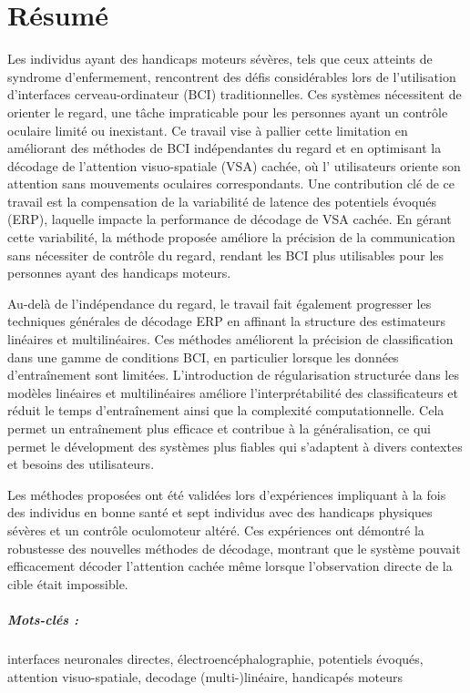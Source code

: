 \chapter*{R\'esum\'e}

Les individus ayant des handicaps moteurs sévères, tels que ceux atteints de
syndrome d'enfermement, rencontrent des défis considérables
lors de l'uti\-li\-sa\-tion d'interfaces cerveau-ordinateur (BCI)  traditionnelles.
Ces systèmes nécessitent de orienter le regard, une tâche impraticable pour
les personnes ayant un contrôle oculaire limité ou inexistant.
Ce travail vise \`a pallier cette limitation en améliorant des méthodes de BCI
indépendantes du regard et en optimisant la décodage de l'attention visuo-spatiale (VSA) cachée,
où l' utilisateurs oriente son attention sans mouvements oculaires correspondants.
Une contribution clé de ce travail est la compensation de
la variabilité de latence des potentiels évoqués (ERP), laquelle impacte
la performance de décodage de VSA cachée.
En gérant cette variabilit\'e, la méthode proposée améliore la précision de la communication
sans nécessiter de contrôle du regard, rendant les BCI plus utilisables pour les personnes ayant des handicaps moteurs.

Au-delà de l'indépendance du regard, le travail fait également progresser les
techniques générales de décodage ERP en affinant la structure des estimateurs
linéaires et multilinéaires.
Ces méthodes améliorent la précision de classification dans une gamme de
conditions BCI, en particulier lorsque les données d'entraînement sont limitées.
L'introduction de régularisation structurée dans les modèles linéaires et
multilinéaires améliore l'interprétabilité des classificateurs et réduit le temps d'entraînement ainsi que la complexité computationnelle.
Cela permet un entraînement plus efficace et contribue à la g\'en\'eralisation, ce qui
permet le d\'evelopment des systèmes plus fiables qui s'adaptent à divers
contextes et besoins des utilisateurs.

Les méthodes proposées ont été validées lors d'expériences impliquant à la fois
des individus en bonne santé et sept individus avec des handicaps physiques sévères et un contrôle oculomoteur altéré.
Ces expériences ont démontré la robustesse des nouvelles méthodes de décodage, montrant que le système pouvait efficacement décoder l'attention cachée même lorsque l'observation directe de la cible  était impossible.

\bigskip

\paragraph{Mots-clés :}
interfaces neuronales directes,
\'electroenc\'ephalographie,
potentiels \'evoqu\'es,
attention visuo-spatiale,
decodage (multi-)linéaire,
handicap\'es moteurs
